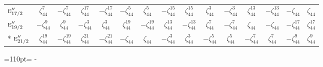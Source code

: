 \documentclass[10pt,a4paper]{article}
\newcommand{\needspace}[1]{\par\penalty-100\begingroup\dimen0=#1\relax\dimen2=\pagegoal
  \advance\dimen2-\pagetotal\ifdim\dimen0>\dimen2\relax\ifdim\dimen2>0pt\vfil\break\fi\fi
  \endgroup}
\numberwithin{equation}{section}
\newcommand{\irr}[1]{\text{\normalfont\scshape #1}}
\newcommand{\rootunity}[1]{\zeta_{#1}}
\begin{document}
{\begin{longtable}{@{}lcccccccccccccc@{}}
$\irr{e}_{17/2}''$ & $\rootunity{44}^{7}$ & $-\rootunity{44}^{7}$ & $\rootunity{44}^{17}$ & $-\rootunity{44}^{17}$ & $-\rootunity{44}^{5}$ & $\rootunity{44}^{5}$ & $-\rootunity{44}^{15}$ & $\rootunity{44}^{15}$ & $\rootunity{44}^{3}$ & $-\rootunity{44}^{3}$ & $\rootunity{44}^{13}$ & $-\rootunity{44}^{13}$ & $-\rootunity{44}$ & $\rootunity{44}$\\
$\irr{e}_{19/2}''$ & $-\rootunity{44}^{9}$ & $\rootunity{44}^{9}$ & $-\rootunity{44}^{3}$ & $\rootunity{44}^{3}$ & $\rootunity{44}^{19}$ & $-\rootunity{44}^{19}$ & $\rootunity{44}^{13}$ & $-\rootunity{44}^{13}$ & $\rootunity{44}^{7}$ & $-\rootunity{44}^{7}$ & $\rootunity{44}$ & $-\rootunity{44}$ & $-\rootunity{44}^{17}$ & $\rootunity{44}^{17}$\\*
$\irr{e}_{21/2}''$ & $\rootunity{44}^{19}$ & $-\rootunity{44}^{19}$ & $\rootunity{44}^{21}$ & $-\rootunity{44}^{21}$ & $-\rootunity{44}$ & $\rootunity{44}$ & $-\rootunity{44}^{3}$ & $\rootunity{44}^{3}$ & $-\rootunity{44}^{5}$ & $\rootunity{44}^{5}$ & $-\rootunity{44}^{7}$ & $\rootunity{44}^{7}$ & $-\rootunity{44}^{9}$ & $\rootunity{44}^{9}$\\
\bottomrule\end{longtable}}
\needspace{110pt}
\end{document}
